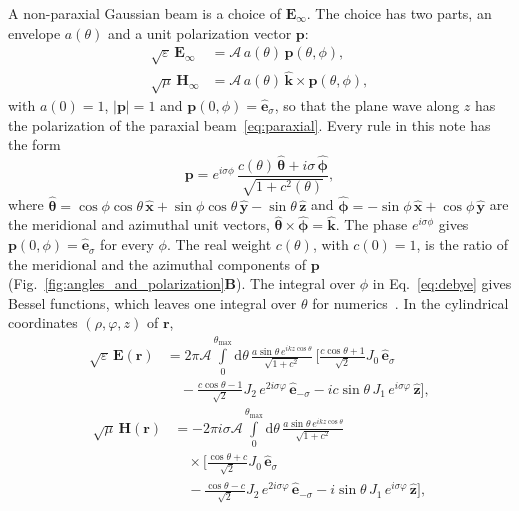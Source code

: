 \documentclass[
	aps,
	pra,
	reprint,
	amsmath,
	amssymb,
	superscriptaddress,
	nofootinbib
]{revtex4-2}
\begin{document}
A non-paraxial Gaussian beam is a choice of $\mathbf{E}_\infty$. The choice has two parts, an envelope $a(\theta)$ and a unit polarization vector $\mathbf p$:
\begin{equation}
\begin{split}
\sqrt{\varepsilon}\,\mathbf{E}_\infty&=\mathcal A\,a(\theta)\,\mathbf{p}(\theta,\phi),\\
\sqrt{\mu}\,\mathbf{H}_\infty&=\mathcal A\,a(\theta)\,\mathbf{\hat{k}}\times\mathbf{p}(\theta,\phi),
\end{split}
\label{eq:ap}
\end{equation}
with $a(0)=1$, $|\mathbf p|=1$ and $\mathbf p(0,\phi)=\mathbf{\hat{e}}_\sigma$, so that the plane wave along $z$ has the polarization of the paraxial beam~\eqref{eq:paraxial}. Every rule in this note has the form
\begin{equation}
\mathbf p=e^{i\sigma\phi}\,\frac{c(\theta)\,\mathbf{\hat{\boldsymbol{\theta}}}+ i \sigma\,\mathbf{\hat{\boldsymbol{\phi}}}}{\sqrt{1+c^2(\theta)}},
\label{eq:rule}
\end{equation}
where $\mathbf{\hat{\boldsymbol{\theta}}}= \cos\phi \cos\theta\, \mathbf{\hat{x}} + \sin\phi \cos\theta\, \mathbf{\hat{y}} -\sin\theta\, \mathbf{\hat{z}}$ and $\mathbf{\hat{\boldsymbol{\phi}}}= -\sin\phi\, \mathbf{\hat{x}} + \cos\phi\, \mathbf{\hat{y}}$ are the meridional and azimuthal unit vectors, $\mathbf{\hat{\boldsymbol{\theta}}}\times\mathbf{\hat{\boldsymbol{\phi}}}=\mathbf{\hat{k}}$. The phase $e^{i\sigma\phi}$ gives $\mathbf p(0,\phi)=\mathbf{\hat{e}}_\sigma$ for every $\phi$. The real weight $c(\theta)$, with $c(0)=1$, is the ratio of the meridional and the azimuthal components of $\mathbf p$ (Fig.~\ref{fig:angles_and_polarization}\textsf{\textbf{B}}). The integral over $\phi$ in Eq.~\eqref{eq:debye} gives Bessel functions, which leaves one integral over $\theta$ for numerics~\cite{toftul2026github_nonparax}. In the cylindrical coordinates $(\rho,\varphi,z)$ of $\mathbf r$,
\begin{align}
\sqrt{\varepsilon}\,\mathbf E(\mathbf r)&=2\pi\mathcal A\int \limits_0^{\theta_{\max}}\mathrm{d}\theta\,\frac{a\sin\theta\,e^{ikz\cos\theta}}{\sqrt{1+c^2}}\,\Big[\frac{c\cos\theta+1}{\sqrt2}J_0\,\mathbf{\hat e}_\sigma
\nonumber\\&\quad
-\frac{c\cos\theta-1}{\sqrt2}J_2\,e^{2i\sigma\varphi}\,\mathbf{\hat e}_{-\sigma}
-i c\sin\theta\,J_1\,e^{i\sigma\varphi}\,\mathbf{\hat z}\Big],
\label{eq:bessel}
\end{align}
\begin{align}
\sqrt{\mu}\,\mathbf H(\mathbf r)&=-2\pi i\sigma\mathcal A\int \limits_0^{\theta_{\max}}\mathrm{d}\theta\,\frac{a\sin\theta\,e^{ikz\cos\theta}}{\sqrt{1+c^2}}
\nonumber\\&\quad\times
\Big[\frac{\cos\theta+c}{\sqrt2}J_0\,\mathbf{\hat e}_\sigma
\nonumber\\&\quad
-\frac{\cos\theta-c}{\sqrt2}J_2\,e^{2i\sigma\varphi}\,\mathbf{\hat e}_{-\sigma}
-i\sin\theta\,J_1\,e^{i\sigma\varphi}\,\mathbf{\hat z}\Big],
\label{eq:bessel_H}
\end{align}
\end{document}

